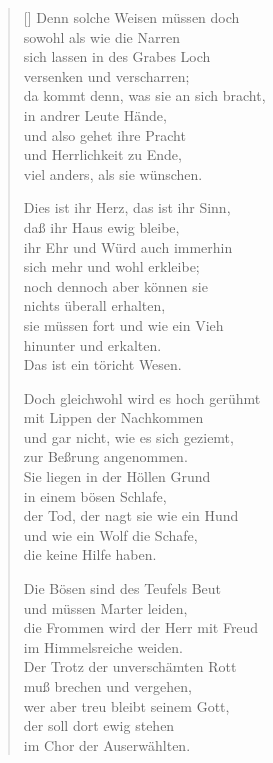 \begin{multicols}{2}
\begin{verse}[\versewidth]
 Denn solche Weisen müssen doch\\
sowohl als wie die Narren\\
sich lassen in des Grabes Loch\\
versenken und verscharren;\\
da kommt denn, was sie an sich bracht,\\
in andrer Leute Hände,\\
und also gehet ihre Pracht\\
und Herrlichkeit zu Ende,\\
viel anders, als sie wünschen.

 Dies ist ihr Herz, das ist ihr Sinn,\\
daß ihr Haus ewig bleibe,\\
ihr Ehr und Würd auch immerhin\\
sich mehr und wohl erkleibe;\\
noch dennoch aber können sie\\
nichts überall erhalten,\\
sie müssen fort und wie ein Vieh\\
hinunter und erkalten.\\
Das ist ein töricht Wesen.

 Doch gleichwohl wird es hoch gerühmt\\
mit Lippen der Nachkommen\\
und gar nicht, wie es sich geziemt,\\
zur Beßrung angenommen.\\
Sie liegen in der Höllen Grund\\
in einem bösen Schlafe,\\
der Tod, der nagt sie wie ein Hund\\
und wie ein Wolf die Schafe,\\
die keine Hilfe haben.

 Die Bösen sind des Teufels Beut\\
und müssen Marter leiden,\\
die Frommen wird der Herr mit Freud\\
im Himmelsreiche weiden.\\
Der Trotz der unverschämten Rott\\
muß brechen und vergehen,\\
wer aber treu bleibt seinem Gott,\\
der soll dort ewig stehen\\
im Chor der Auserwählten.


\end{verse}
\end{multicols}
